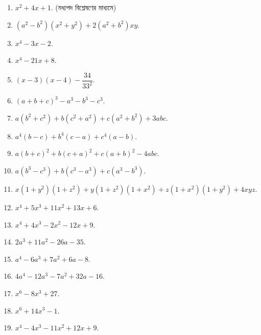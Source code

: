 \documentclass[11pt, a4paper]{article}
\begin{document}
\begin{enumerate}


	\item $ x^2 + 4x + 1 .$ (\textbengali{মধ্যপদ বিশ্লেষণের মাধ্যমে})


	\item $ (a^2 - b^2) (x^2 + y^2) + 2(a^2 + b^2)xy. $
	
	\item $ x^4 - 3x - 2 $.
	
	\item $ x^4 -21x + 8 $.
	
	\item $ (x-3)(x-4) - \dfrac{34}{33^2} $.
	
	\item $ (a+b+c)^3 - a^3 - b^3 - c^3 $.
	
	\item $ a(b^2 + c^2) + b(c^2 + a^2) + c(a^2 + b^2) + 3abc $.
	
	\item $ a^4(b-c) + b^4(c-a) + c^4(a-b) $.
	
	\item $ a(b+c)^2 + b(c+a)^2 + c(a+b)^2 - 4abc $.
	
	\item $ a(b^3 - c^3) + b(c^3 - a^3) + c(a^3 - b^3) $.
	
	\item $ x(1+y^2) (1+z^2) + y(1+z^2) (1+x^2) + z(1+x^2) (1+y^2) + 4xyz $.
	
	\item $ x^4 + 5x^3 + 11x^2 + 13x + 6 $.

	\item $ x^4 + 4x^3 - 2x^2 - 12x + 9 $.
	
	\item $ 2a^3 + 11a^2 - 26a - 35 $.
	
	\item $ a^4 - 6a^3 + 7a^2 + 6a - 8 $.
	
	\item $ 4a^4 - 12a^3 - 7a^2 + 32a - 16 $.
	
	\item $ x^6 - 8x^3 + 27 $.
	
	\item $ x^6 + 14x^3 - 1 $.
	
	\item $ x^4 - 4x^3 - 11x^2 + 12x + 9 $.


\end{enumerate}
\end{document}
